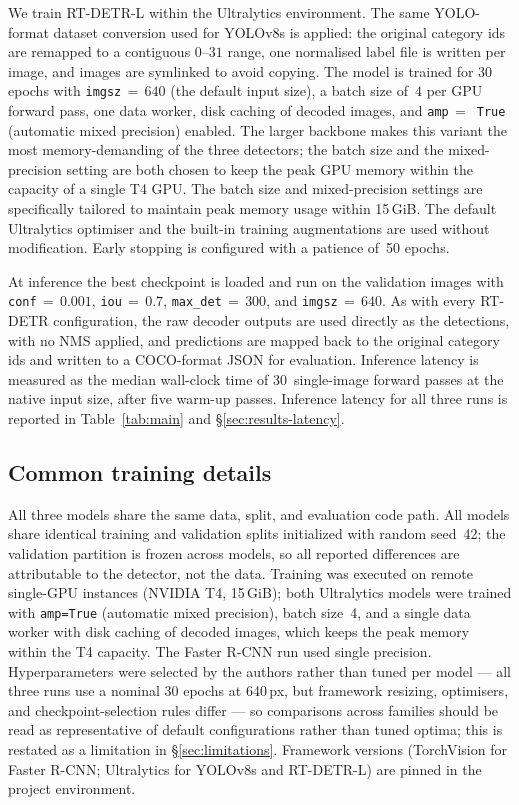 \documentclass[11pt,a4paper,twocolumn]{article}
\begin{document}
We train RT-DETR-L within the Ultralytics environment. The same
YOLO-format dataset conversion used for YOLOv8s is applied: the original
category ids are remapped to a contiguous $0$--$31$ range, one normalised label file is
written per image, and images are symlinked to avoid copying. The model is trained for 30
epochs with \texttt{imgsz}$\,{=}\,640$ (the default input size), a batch size of~$4$ per GPU
forward pass, one data worker, disk caching of decoded images, and \texttt{amp}$\,{=}\,$
\texttt{True} (automatic mixed precision) enabled. The larger backbone makes this variant the
most memory-demanding of the three detectors; the batch size and the mixed-precision setting
are both chosen to keep the peak GPU memory within the capacity of a single T4 GPU. The batch size and mixed-precision settings are specifically tailored to maintain peak memory usage within 15\,GiB. The default Ultralytics optimiser and the built-in training augmentations are
used without modification. Early stopping is configured with a patience of~50 epochs.

At inference the best checkpoint is loaded and run on the validation images with
\texttt{conf}$\,{=}\,0.001$, \texttt{iou}$\,{=}\,0.7$, \texttt{max\_det}$\,{=}\,300$, and
\texttt{imgsz}$\,{=}\,640$. As with every RT-DETR configuration, the raw decoder outputs are used directly
as the detections, with no NMS applied, and predictions are mapped back to the original
category ids and written to a COCO-format JSON for evaluation. Inference latency is measured
as the median wall-clock time of $30$~single-image forward passes at the native input size,
after five warm-up passes. Inference latency for all three runs is reported in Table~\ref{tab:main} and \S\ref{sec:results-latency}.

\subsection{Common training details}
\label{sec:methods-training}

All three models share the same data, split, and evaluation code path. All models
share identical training and validation splits initialized with random seed~42;
the validation partition is frozen across models, so all reported differences are
attributable to the detector, not the data. Training was executed on
remote single-GPU instances (NVIDIA T4, 15\,GiB); both Ultralytics models
were trained with \texttt{amp=True} (automatic mixed precision), batch
size~4, and a single data worker with disk caching of decoded images, which
keeps the peak memory within the T4 capacity. The Faster R-CNN run used
single precision. Hyperparameters were selected by the authors rather than
tuned per model --- all three runs use a nominal 30 epochs at 640\,px, but framework resizing, optimisers, and checkpoint-selection rules differ --- so comparisons across families
should be read as representative of default configurations rather than
tuned optima; this is restated as a limitation in
\S\ref{sec:limitations}. Framework versions (TorchVision for Faster R-CNN; Ultralytics for YOLOv8s
and RT-DETR-L) are pinned in the project environment.
\end{document}
